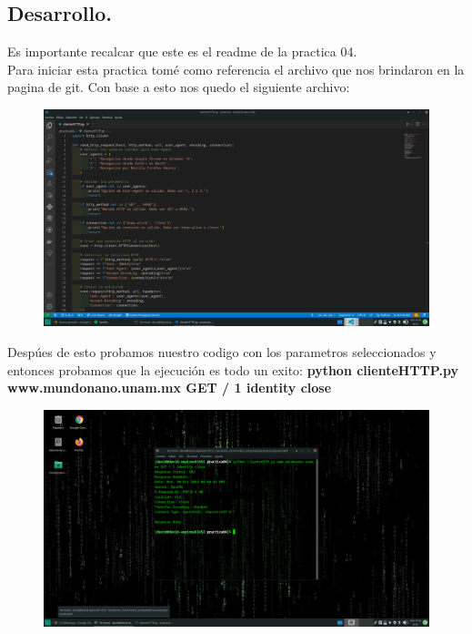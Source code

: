 \documentclass[14pt]{book}
\begin{document}
{\color{blue} \subsection*{\textbf{Desarrollo.}}}
\vspace{1em}

Es importante recalcar que este es el readme de la practica 04.\\

Para iniciar esta practica tomé como referencia el archivo que nos brindaron en la pagina de git. Con base a esto nos quedo el siguiente archivo:\\

\begin{figure}[h]
  \centering
  \includegraphics[width=15cm]{images/capturaaaaaaaaaaa.png}
\end{figure}

Despúes de esto probamos nuestro codigo con los parametros seleccionados y entonces probamos que la ejecución es todo un exito:
\textbf{python clienteHTTP.py www.mundonano.unam.mx GET / 1 identity close}\\

\begin{figure}[h]
  \centering
  \includegraphics[width=15cm]{images/prueba de jala.png}
\end{figure}
\end{document}
